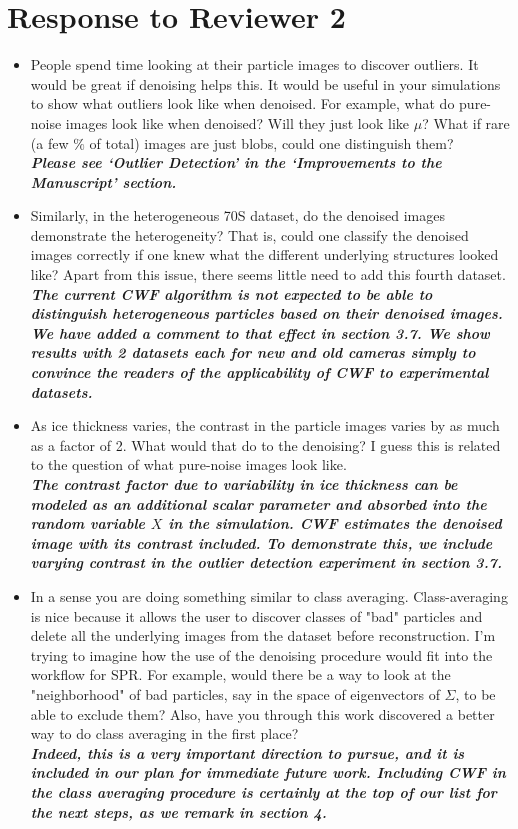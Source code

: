 \documentclass{article}
\begin{document}
\section*{Response to Reviewer 2}
\begin{itemize}
\item  People spend time looking at their particle images to discover outliers.  
It would be great if denoising helps this.  It would be useful in your 
simulations to show what outliers look like when denoised.  For example, what do 
pure-noise images look like when denoised?  Will they just look like $\mu$?  What 
if rare (a few $\%$ of total) images are just blobs, could one distinguish them?\\
\textbf{\textit{Please see `Outlier Detection' in the `Improvements to the Manuscript' section.}}

\item  Similarly, in the heterogeneous 70S dataset, do the denoised images 
demonstrate the heterogeneity?  That is, could one classify the denoised images 
correctly if one knew what the different underlying structures looked like?  
Apart from this issue, there seems little need to add this fourth dataset.\\
\textbf{\textit{The current CWF algorithm is not expected to be able to distinguish heterogeneous particles
based on their denoised images. We have added a comment to that effect in section 3.7. We show results with 2 datasets
each for new and old cameras simply to convince the readers of the applicability of CWF to experimental datasets.}}

\item  As ice thickness varies, the contrast in the particle images varies by as 
much as a factor of 2.  What would that do to the denoising?  I guess this is 
related to the question of what pure-noise images look like.\\
\textbf{\textit{The contrast factor due to variability in ice thickness can be modeled as an additional scalar parameter
and absorbed into the random variable $X$ in the simulation. CWF estimates the denoised image with its contrast included. To demonstrate this, 
we include varying contrast in the outlier detection experiment in section 3.7.}}


\item In a sense you are doing something similar to class averaging.  
Class-averaging is nice because it allows the user to discover classes of "bad" 
particles and delete all the underlying images from the dataset before 
reconstruction.  I'm trying to imagine how the use of the denoising procedure 
would fit into the workflow for SPR.  For example, would there be a way to look 
at the "neighborhood" of bad particles, say in the space of eigenvectors of 
$\Sigma$, to be able to exclude them?  Also, have you through this work discovered 
a better way to do class averaging in the first place?\\
\textbf{\textit{Indeed, this is a very important direction to pursue, and it 
is included in our plan for immediate future work.
Including CWF in the class averaging procedure is certainly at the top of our list for 
the next steps, as we remark in section 4.}}



\end{itemize}
\end{document}
